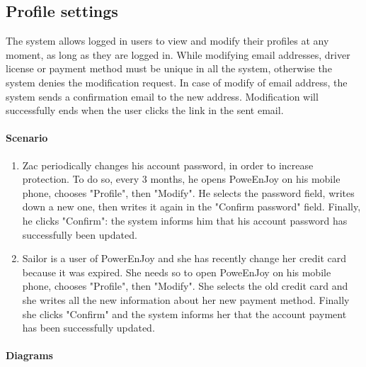\subsection{Profile settings}
The system allows logged in users to view and modify their profiles at any moment, as long as they are logged in. While modifying email addresses, driver license or payment method must be unique in all the system, otherwise the system denies the modification request. In case of modify of email address, the system sends a confirmation email to the new address. Modification will successfully ends when the user clicks the link in the sent email.
\paragraph{Scenario}
\begin{enumerate}
	\item  Zac periodically changes his account password, in order to increase protection. To do so, every 3 months, he opens PoweEnJoy on his mobile phone, chooses "Profile", then "Modify". He selects the password field, writes down a new one, then writes it again in the "Confirm password" field. Finally, he clicks "Confirm": the system informs him that his account password has successfully been updated.
	\item Sailor is a user of PowerEnJoy and she has recently change her credit card because it was expired. She needs so to open PoweEnJoy on his mobile phone, chooses "Profile", then "Modify". She selects the old credit card and she writes all the new information about her new payment method. Finally she clicks "Confirm" and the system informs her that the account payment has been successfully updated.
\end{enumerate}
\paragraph{Diagrams}
